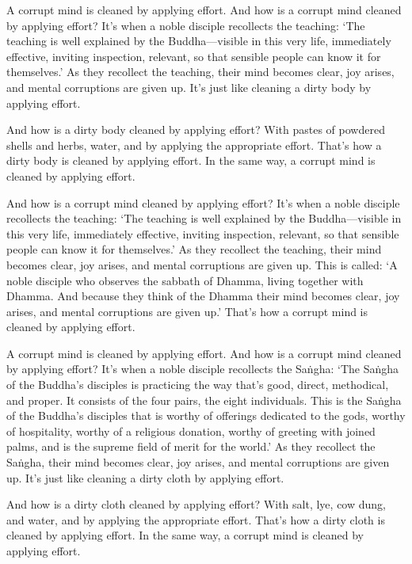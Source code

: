 \documentclass[12pt,openany]{book}%
\begin{document}
A corrupt mind is cleaned by applying effort. And how is a corrupt mind cleaned by applying effort? It’s when a noble disciple recollects the teaching: ‘The teaching is well explained by the Buddha—visible in this very life, immediately effective, inviting inspection, relevant, so that sensible people can know it for themselves.’ As they recollect the teaching, their mind becomes clear, joy arises, and mental corruptions are given up. It’s just like cleaning a dirty body by applying effort. 

And how is a dirty body cleaned by applying effort? With pastes of powdered shells and herbs, water, and by applying the appropriate effort. That’s how a dirty body is cleaned by applying effort. In the same way, a corrupt mind is cleaned by applying effort. 

And how is a corrupt mind cleaned by applying effort? It’s when a noble disciple recollects the teaching: ‘The teaching is well explained by the Buddha—visible in this very life, immediately effective, inviting inspection, relevant, so that sensible people can know it for themselves.’ As they recollect the teaching, their mind becomes clear, joy arises, and mental corruptions are given up. This is called: ‘A noble disciple who observes the sabbath of Dhamma, living together with Dhamma. And because they think of the Dhamma their mind becomes clear, joy arises, and mental corruptions are given up.’ That’s how a corrupt mind is cleaned by applying effort. 

A corrupt mind is cleaned by applying effort. And how is a corrupt mind cleaned by applying effort? It’s when a noble disciple recollects the \textsanskrit{Saṅgha}: ‘The \textsanskrit{Saṅgha} of the Buddha’s disciples is practicing the way that’s good, direct, methodical, and proper. It consists of the four pairs, the eight individuals. This is the \textsanskrit{Saṅgha} of the Buddha’s disciples that is worthy of offerings dedicated to the gods, worthy of hospitality, worthy of a religious donation, worthy of greeting with joined palms, and is the supreme field of merit for the world.’ As they recollect the \textsanskrit{Saṅgha}, their mind becomes clear, joy arises, and mental corruptions are given up. It’s just like cleaning a dirty cloth by applying effort. 

And how is a dirty cloth cleaned by applying effort? With salt, lye, cow dung, and water, and by applying the appropriate effort. That’s how a dirty cloth is cleaned by applying effort. In the same way, a corrupt mind is cleaned by applying effort. 
\end{document}
